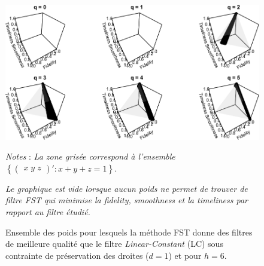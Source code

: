 \documentclass[
  11pt,
  french,
  a4paper]{article}
\newcommand\1{\mathds{1}}
\begin{document}
\begin{figure}[H]

{\centering \includegraphics{img/bookdown/pdf/lc6d1-1} 

}

\caption[Ensemble des poids pour lesquels la méthode FST donne des filtres de meilleure qualité que le filtre \emph{Linear-Constant} (LC) sous contrainte de préservation des droites (\(d=1\)) et pour \(h=6\)]{Ensemble des poids pour lesquels la méthode FST donne des filtres de meilleure qualité que le filtre \emph{Linear-Constant} (LC) sous contrainte de préservation des droites (\(d=1\)) et pour \(h=6\).}\label{fig:lc6d1}

\footnotesize


\emph{Notes} : \emph{La zone grisée correspond à l'ensemble \(\left\{\begin{pmatrix}x \; y \; z \end{pmatrix}' : x+y+z=1\right\}\).}

\emph{Le graphique est vide lorsque aucun poids ne permet de trouver de filtre FST qui minimise la \emph{fidelity}, \emph{smoothness} et la \emph{timeliness} par rapport au filtre étudié.}
\normalsize\end{figure}
\end{document}

